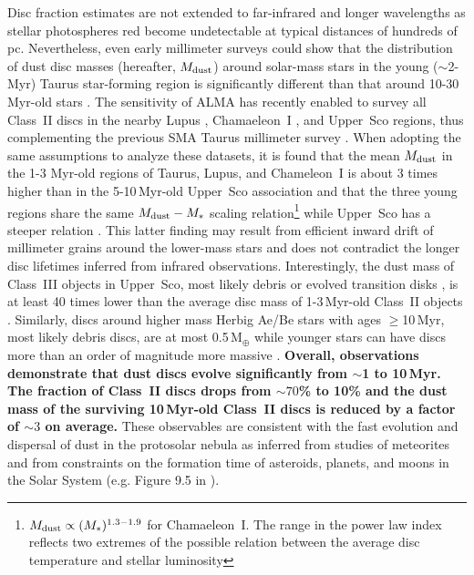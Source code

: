 \documentclass{rsos}
\begin{document}
Disc fraction estimates are not extended to far-infrared and longer wavelengths as  stellar photospheres red become undetectable at typical distances of hundreds of pc. Nevertheless, even early millimeter surveys could show that the distribution of dust disc masses (hereafter, $M_{\rm dust}$) around solar-mass stars in the young ($\sim$2-Myr) Taurus star-forming region is significantly different than that around 10-30\,Myr-old stars 
\cite{2005AJ....129.1049C}. The sensitivity of ALMA has recently enabled to survey all Class~II discs in the nearby Lupus \cite{2016ApJ...828...46A}, Chamaeleon~I \cite{2016ApJ...831..125P}, and Upper~Sco \cite{2016ApJ...827..142B} regions, thus complementing the previous SMA Taurus millimeter survey \cite{2013ApJ...771..129A}. When adopting the same assumptions to analyze these datasets, it is found that the mean $M_{\rm dust}$ in the 1-3 Myr-old regions of Taurus, Lupus, and Chameleon~I is about 3 times higher than in the 5-10\,Myr-old Upper~Sco association and that the three young regions share the same $M_{\rm dust}-M_*$ scaling relation\footnote{$M_{\rm dust} \propto (M_*)^{1.3-1.9}$ for Chamaeleon~I. The range in the power law index reflects two extremes of the possible relation between the average disc temperature and stellar luminosity} while Upper~Sco has a steeper relation \cite{2016ApJ...831..125P}. This latter finding may result from efficient inward drift of millimeter grains around the lower-mass stars and does not contradict the longer disc lifetimes inferred from infrared observations.  Interestingly, the dust mass of Class~III objects in Upper~Sco, most likely debris or evolved transition disks \cite{2016ApJ...827..142B}, is at least 40 times lower than the average disc mass of 1-3\,Myr-old Class~II objects \cite{2016ApJ...831..125P}. Similarly, discs around higher mass Herbig Ae/Be stars with ages $\ge$10\,Myr, most likely debris discs, are at most 0.5\,M$_{\oplus}$ while younger stars can have discs more than an order of magnitude more massive \cite{2013MNRAS.435.1037P}.
{\bf Overall, observations demonstrate that dust discs evolve significantly from $\sim$1 to 10\,Myr. The fraction of Class~II discs drops from $\sim 70$\% to 10\% and the dust mass of the surviving 10\,Myr-old Class~II discs is reduced by a factor of $\sim 3$ on average.} These observables are consistent with the fast evolution and dispersal of dust in the protosolar nebula as inferred from studies of meteorites and from constraints on the formation time of asteroids, planets, and moons in the Solar System (e.g. Figure 9.5 in \cite{2010pdac.book..263P}). 
\end{document}
